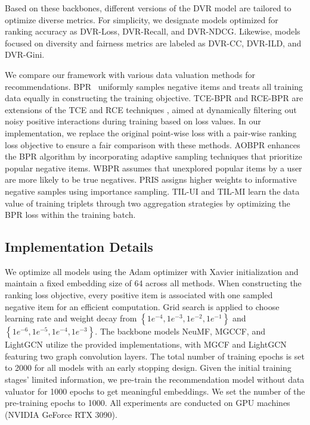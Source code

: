 Based on these backbones, different versions of the DVR model are tailored to optimize diverse metrics. For simplicity, we designate models optimized for ranking accuracy as DVR-Loss, DVR-Recall, and DVR-NDCG. Likewise, models focused on diversity and fairness metrics are labeled as DVR-CC, DVR-ILD, and DVR-Gini. 


We compare our framework with various data valuation methods for recommendations. BPR~\cite{10.5555/1795114.1795167} uniformly samples negative items and treats all training data equally in constructing the training objective. TCE-BPR and RCE-BPR are extensions of the TCE and RCE techniques \cite{10.1145/3437963.3441800}, aimed at dynamically filtering out noisy positive interactions during training based on loss values. In our implementation, we replace the original point-wise loss with a pair-wise ranking loss objective to ensure a fair comparison with these methods. AOBPR \cite{10.1145/2556195.2556248} enhances the BPR algorithm by incorporating adaptive sampling techniques that prioritize popular negative items. WBPR \cite{gantner2012personalized} assumes that unexplored popular items by a user are more likely to be true negatives. PRIS \cite{10.1145/3366423.3380187} assigns higher weights to informative negative samples using importance sampling. TIL-UI and TIL-MI \cite{wu2022adapting} learn the data value of training triplets through two aggregation strategies by optimizing the BPR loss within the training batch.

\subsection{Implementation Details} \label{app:implenmentation}
We optimize all models using the Adam optimizer with Xavier initialization \cite{glorot2010understanding} and maintain a fixed embedding size of 64 across all methods. When constructing the ranking loss objective, every positive item is associated with one sampled negative item for an efficient computation. Grid search is applied to choose learning rate and weight decay from $\left\{1e^{-4}, 1e^{-3}, 1e^{-2}, 1e^{-1}\right\}$ and $\left\{1e^{-6}, 1e^{-5}, 1e^{-4}, 1e^{-3}\right\}$. The backbone models NeuMF, MGCCF, and LightGCN utilize the provided implementations, with MGCF and LightGCN featuring two graph convolution layers. The total number of training epochs is set to 2000 for all models with an early stopping design. Given the initial training stages' limited information, we pre-train the recommendation model without data valuator for 1000 epochs to get meaningful embeddings. We set the number of the pre-training epochs to 1000. All experiments are conducted on GPU machines (NVIDIA GeForce RTX 3090).

